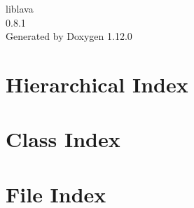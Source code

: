 \documentclass[twoside]{book}
\newcommand{\+}{\discretionary{\mbox{\scriptsize$\hookleftarrow$}}{}{}}
\newcommand{\clearemptydoublepage}{%
    \newpage{\pagestyle{empty}\cleardoublepage}%
  }
\begin{document}
  \raggedbottom
    \hypersetup{pageanchor=false,
                bookmarksnumbered=true,
                pdfencoding=unicode
               }
  \begin{titlepage}
  \vspace*{7cm}
  \begin{center}%
  {\Large liblava}\\
  [1ex]\large 0.\+8.\+1 \\
  \vspace*{1cm}
  {\large Generated by Doxygen 1.12.0}\\
  \end{center}
  \end{titlepage}
  \clearemptydoublepage
  \tableofcontents
  \clearemptydoublepage
  \hypersetup{pageanchor=true}
\chapter{Hierarchical Index}

\chapter{Class Index}

\chapter{File Index}

\end{document}
